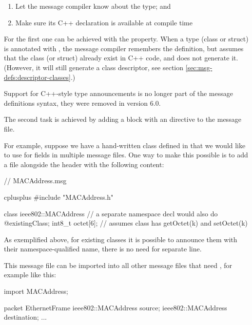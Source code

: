\begin{enumerate}
   \item Let the message compiler know about the type; and
   \item Make sure its C++ declaration is available at compile time
\end{enumerate}

For the first one can be achieved with the  property. When
a type (class or struct) is annotated with , the message
compiler remembers the definition, but assumes that the class (or struct)
already exist in C++ code, and does not generate it. (However, it will still
generate a class descriptor, see section \ref{sec:msg-defs:descriptor-classes}.)

\begin{note}
Support for C++-style type announcements is no longer part of the message
definitions syntax, they were removed in {\opp} version 6.0.
\end{note}

The second task is achieved by adding a  block with
an  directive to the message file.

For example, suppose we have a hand-written  class
defined in  that we would like to use for fields in multiple
message files. One way to make this possible is to add a 
file alongside the header with the following content:

\begin{msg}
// MACAddress.msg

cplusplus {{
#include "MACAddress.h"
}}

class ieee802::MACAddress  // a separate namespace decl would also do
{
    @existingClass;
    int8_t octet[6]; // assumes class has getOctet(k) and setOctet(k)
}
\end{msg}

As exemplified above, for existing classes it is possible to announce
them with their namespace-qualified name, there is no need for separate
 line.

This message file can be imported into all other message files that need
, for example like this:

\begin{msg}
import MACAddress;

packet EthernetFrame {
    ieee802::MACAddress source;
    ieee802::MACAddress destination;
    ...
}
\end{msg}


